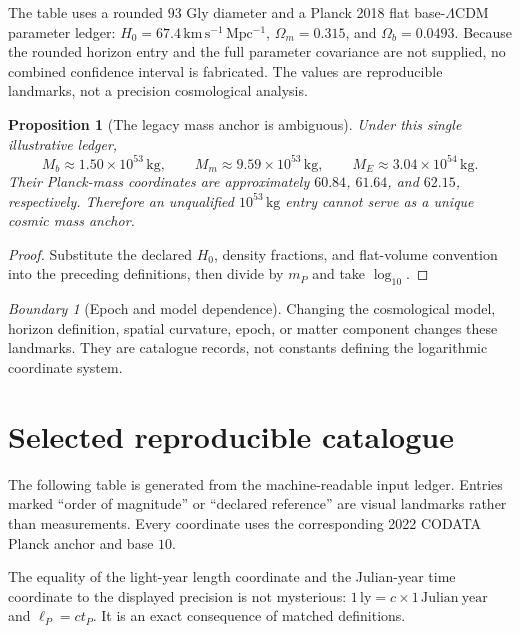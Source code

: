 \documentclass[11pt,a4paper]{article}
\theoremstyle{definition}
\theoremstyle{plain}
\newtheorem{proposition}[definition]{Proposition}
\theoremstyle{remark}
\newtheorem{warning}[definition]{Boundary}
\begin{document}


The table uses a rounded $93$ Gly diameter and a Planck 2018 flat
base-$\Lambda$CDM parameter ledger:
$H_0=67.4\,\mathrm{km\,s^{-1}\,Mpc^{-1}}$,
$\Omega_m=0.315$, and $\Omega_b=0.0493$. Because the rounded horizon
entry and the full parameter covariance are not supplied, no combined
confidence interval is fabricated. The values are reproducible
landmarks, not a precision cosmological analysis.

\begin{proposition}[The legacy mass anchor is ambiguous]
Under this single illustrative ledger,
\[
M_b\approx1.50\times10^{53}\,\mathrm{kg},\qquad
M_m\approx9.59\times10^{53}\,\mathrm{kg},\qquad
M_E\approx3.04\times10^{54}\,\mathrm{kg}.
\]
Their Planck-mass coordinates are approximately
$60.84$, $61.64$, and $62.15$, respectively. Therefore an unqualified
$10^{53}\,\mathrm{kg}$ entry cannot serve as a unique cosmic mass
anchor.
\end{proposition}

\begin{proof}
Substitute the declared $H_0$, density fractions, and flat-volume
convention into the preceding definitions, then divide by $m_P$ and take
$\log_{10}$.
\end{proof}

\begin{warning}[Epoch and model dependence]
Changing the cosmological model, horizon definition, spatial curvature,
epoch, or matter component changes these landmarks. They are catalogue
records, not constants defining the logarithmic coordinate system.
\end{warning}

\section{Selected reproducible catalogue}

The following table is generated from the machine-readable input ledger.
Entries marked ``order of magnitude'' or ``declared reference'' are
visual landmarks rather than measurements. Every coordinate uses the
corresponding 2022 CODATA Planck anchor and base $10$.



The equality of the light-year length coordinate and the Julian-year
time coordinate to the displayed precision is not mysterious:
$1\,\mathrm{ly}=c\times1\,\mathrm{Julian\ year}$ and
$\ell_P=ct_P$. It is an exact consequence of matched definitions.
\end{document}
